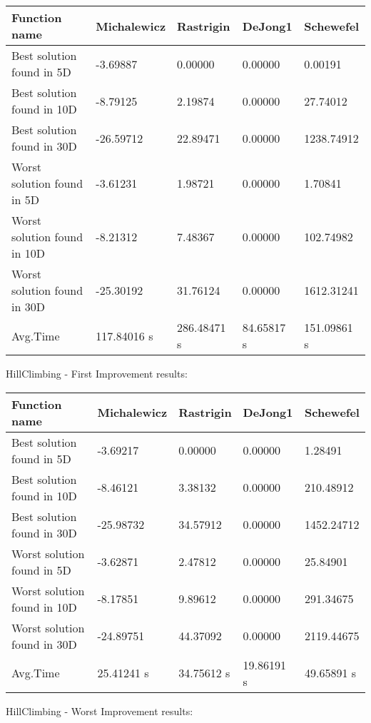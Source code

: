\documentclass[10pt]{article}
\begin{document}
\begin{center}
\begin{tabular}{|l|l|l|l|l|}
\hline
Function name & Michalewicz & Rastrigin & DeJong1 & Schewefel \\
\hline
Best solution found in 5D & -3.69887 & 0.00000 & 0.00000 & 0.00191 \\
\hline
Best solution found in 10D & -8.79125 & 2.19874 & 0.00000 & 27.74012 \\
\hline
Best solution found in 30D & -26.59712 & 22.89471 & 0.00000 & 1238.74912 \\
\hline
Worst solution found in 5D & -3.61231 & 1.98721 & 0.00000 & 1.70841 \\
\hline
Worst solution found in 10D & -8.21312 & 7.48367 & 0.00000 & 102.74982 \\
\hline
Worst solution found in 30D & -25.30192 & 31.76124 & 0.00000 & 1612.31241 \\
\hline
Avg.Time & 117.84016 s & 286.48471 s & 84.65817 s & 151.09861 s \\
\hline
\end{tabular}
\end{center}

HillClimbing - First Improvement results:

\begin{center}
\begin{tabular}{|l|l|l|l|l|}
\hline
Function name & Michalewicz & Rastrigin & DeJong1 & Schewefel \\
\hline
Best solution found in 5D & -3.69217 & 0.00000 & 0.00000 & 1.28491 \\
\hline
Best solution found in 10D & -8.46121 & 3.38132 & 0.00000 & 210.48912 \\
\hline
Best solution found in 30D & -25.98732 & 34.57912 & 0.00000 & 1452.24712 \\
\hline
Worst solution found in 5D & -3.62871 & 2.47812 & 0.00000 & 25.84901 \\
\hline
Worst solution found in 10D & -8.17851 & 9.89612 & 0.00000 & 291.34675 \\
\hline
Worst solution found in 30D & -24.89751 & 44.37092 & 0.00000 & 2119.44675 \\
\hline
Avg.Time & 25.41241 s & 34.75612 s & 19.86191 s & 49.65891 s \\
\hline
\end{tabular}
\end{center}

HillClimbing - Worst Improvement results:
\end{document}
